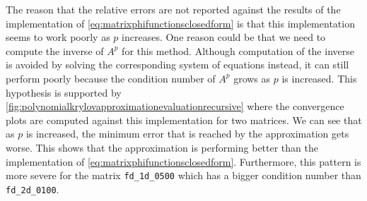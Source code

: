 \begin{remark}
    The reason that the relative errors are not reported against the results of the implementation of
    \eqref{eq:matrixphifunctionsclosedform} is that this implementation seems to work poorly as $p$ increases.
    One reason could be that we need to compute the inverse of $A^p$ for this method. Although computation of the
    inverse is avoided by solving the corresponding system of equations instead, it can still perform poorly because
    the condition number of $A^p$ grows as $p$ is increased. This hypothesis is supported by
    \autoref{fig:polynomialkrylovapproximationevaluationrecursive} where the convergence plots are computed against this implementation
    for two matrices. We can see that as $p$ is increased, the minimum error that is reached by the approximation gets worse.
    This shows that the approximation is performing better than the implementation of \eqref{eq:matrixphifunctionsclosedform}.
    Furthermore, this pattern is more severe for the matrix \texttt{fd\_1d\_0500} which has a bigger condition number
    than \texttt{fd\_2d\_0100}.
\end{remark}

